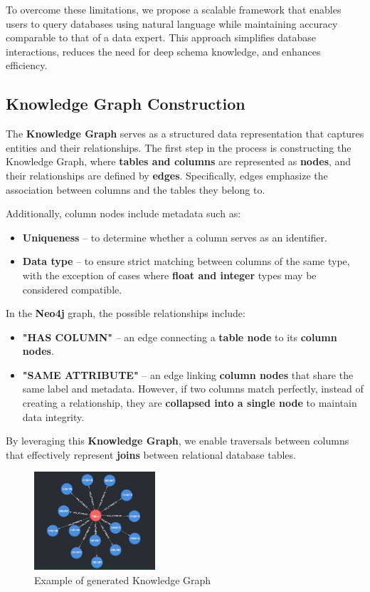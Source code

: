To overcome these limitations, we propose a scalable framework that enables users to query databases using natural language while maintaining accuracy comparable to that of a data expert. This approach simplifies database interactions, reduces the need for deep schema knowledge, and enhances efficiency.

\subsection{Knowledge Graph Construction}
The \textbf{Knowledge Graph} serves as a structured data representation that captures entities and their relationships. The first step in the process is constructing the Knowledge Graph, where \textbf{tables and columns} are represented as \textbf{nodes}, and their relationships are defined by \textbf{edges}. Specifically, edges emphasize the association between columns and the tables they belong to.  

Additionally, column nodes include metadata such as:  
\begin{itemize}
    \item \textbf{Uniqueness} – to determine whether a column serves as an identifier.
    \item \textbf{Data type} – to ensure strict matching between columns of the same type, with the exception of cases where \textbf{float and integer} types may be considered compatible.
\end{itemize}

In the \textbf{Neo4j} graph, the possible relationships include:  
\begin{itemize}
    \item \textbf{"HAS COLUMN"} – an edge connecting a \textbf{table node} to its \textbf{column nodes}.
    \item \textbf{"SAME ATTRIBUTE"} – an edge linking \textbf{column nodes} that share the same label and metadata. However, if two columns match perfectly, instead of creating a relationship, they are \textbf{collapsed into a single node} to maintain data integrity.
\end{itemize}

By leveraging this \textbf{Knowledge Graph}, we enable traversals between columns that effectively represent \textbf{joins} between relational database tables.
\begin{figure}[h]
    \centering
\includegraphics[width=0.4\textwidth]{IMAGES/KGschema.JPG}
    \caption{Example of generated Knowledge Graph}
    \label{fig:Knowledge Graph}
\end{figure}


